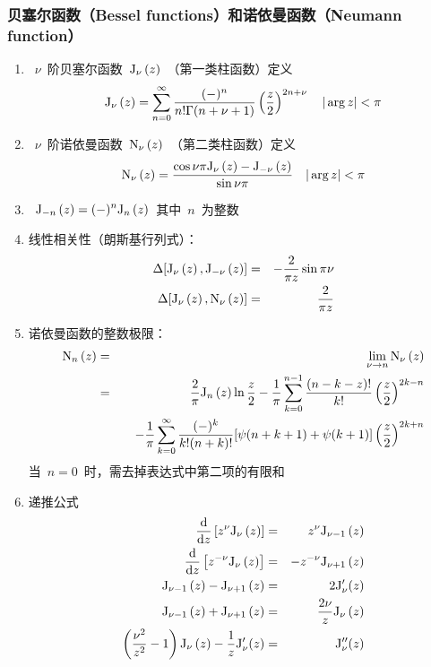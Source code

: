\documentclass[12pt,a4paper]{article}
\newcommand\dif{\mathrm{d}}
\renewcommand{\[}{\ $\displaystyle}
\renewcommand{\]}{$\ }%
\newcommand{\fdif}[2]{\ensuremath{\frac{\dif #1}{\dif #2}}}
\newcommand{\summ}[2][n]{\sum_{#1=#2}^\infty}
\begin{document}
	  \subsubsection{贝塞尔函数（Bessel functions）和诺依曼函数（Neumann function）}
	   \begin{enumerate}
	     \item \[\nu\]阶贝塞尔函数\[\fj{z}\]（第一类柱函数）定义
	     	$$
	     	  \fj{z} =\summ{0} \frac{(-)^n}{n! \Gamma(n + \nu + 1)}\left(\frac z2\right)^{2n+\nu} \quad |\arg z|<\pi
	     	$$
	     \item \[\nu\]阶诺依曼函数\[\fn{z}\]（第二类柱函数）定义
	     	$$
	     	  \fn{z} = \frac{\cos \nu\pi \fj{z} - \fj[-\nu]{z}}{\sin \nu\pi} \quad |\arg z|<\pi
	     	$$
	     \item \[\fj[-n]{z} = (-)^n\fj[n]{z}\]其中\[n\]为整数
	     \item 线性相关性（朗斯基行列式）：
	     	\begin{eqnarray*}
	     	 \Delta[\fj{z},\fj[-\nu]{z}] &=& -\frac{2}{\pi z}\sin \pi\nu \\
	     	 \Delta[\fj{z},\fn{z}] &=& \frac{2}{\pi z}
	     	\end{eqnarray*}
	     \item 诺依曼函数的整数极限：
	     	\begin{eqnarray*}
	     	 \fn[n]{z} &=& \lim\limits_{\nu\to n}\fn{z} \\
	 	  &=& \frac 2\pi \fj[n]{z}\ln\frac z2 - \frac 1\pi\sum_{k=0}^{n-1}\frac{(n-k-z)!}{k!}\left(\frac z2\right)^{2k-n} \\
	 	  &&\quad -\frac 1\pi\sum_{k=0}^{\infty}\frac{(-)^k}{k!(n+k)!}[\psi(n+k+1)+\psi(k+1)]\left(\frac z2\right)^{2k+n}\\
	     	\end{eqnarray*}
	     	当\[n = 0\]时，需去掉表达式中第二项的有限和
	     \item 递推公式
	     	\begin{eqnarray*}
	     	 \fdif{}{z}\left[z^\nu\fj[\nu]{z}\right] &=& z^\nu\fj[\nu -1]{z} \\
	     	 \fdif{}{z}\left[z^{-\nu}\fj[\nu]{z}\right] &=& -z^{-\nu}\fj[\nu +1]{z} \\
	     	 \fj[\nu-1]{z} - \fj[\nu+1]{z} &=& 2\mathrm J_\nu'(z) \\
	     	 \fj[\nu-1]{z} + \fj[\nu+1]{z} &=& \frac{2\nu}{z}\fj{z} \\
	     	 \left(\frac{\nu^2}{z^2} - 1\right)\fj{z} - \frac 1z\mathrm J_\nu'(z) &=& \mathrm J''_\nu(z)
	     	\end{eqnarray*}

\end{enumerate}
\end{document}
